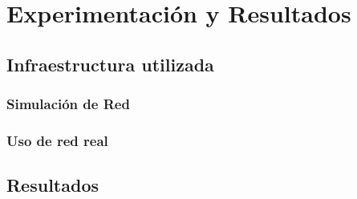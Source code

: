 \chapter{Experimentación y Resultados}
\section{Infraestructura utilizada}

\subsection{Simulación de Red}



\subsection{Uso de red real}




\section{Resultados}